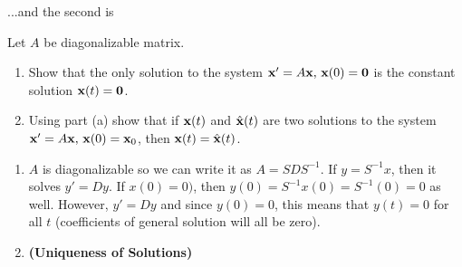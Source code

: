 \documentclass[10pt]{article}
\begin{document}
\newpage

...and the second is
\begin{exercise}
    Let $A$ be diagonalizable matrix.
    \begin{enumerate}[label=(\alph*)]
        \item Show that the only solution to the system $\mathbf{x}'=A\mathbf{x},\, \mathbf{x}(0)=\mathbf{0}$ is the constant solution $\mathbf{x}(t)=\mathbf{0}$.
        \item Using part (a) show that if $\mathbf{x}(t)$ and $\hat{\mathbf{x}}(t)$ are two solutions to the system $\mathbf{x}'=A\mathbf{x},\, \mathbf{x}(0)=\mathbf{x}_0$, then $\mathbf{x}(t)=\hat{\mathbf{x}}(t)$.
    \end{enumerate}
\end{exercise}
\begin{sol}
    \begin{enumerate}[label=(\alph*)]
        \item $A$ is diagonalizable so we can write it as $A=SDS^{-1}$. If $y=S^{-1}x$, then it solves $y' = Dy$. If $x(0)=0)$, then $y(0) = S^{-1}x(0) = S^{-1}(0) = 0$ as well. However, $y' = Dy$ and since $y(0)=0$, this means that $y(t)=0$ for all $t$ (coefficients of general solution will all be zero).  
        \item \textbf{(Uniqueness of Solutions)}
    \end{enumerate}
\end{sol}
\end{document}
